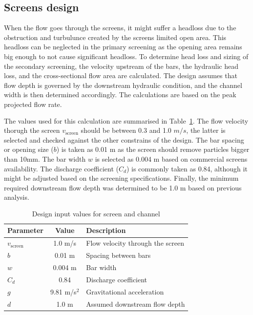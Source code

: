 \documentclass[12pt]{article}
\begin{document}
\subsection{Screens design}
\label{sec:screens_design}

When the flow goes through the screens, it might suffer a headloss due to
the obstruction and turbulunce created by the screens limited open area.
This headloss can be neglected in the primary screening as the opening area
remains big enough to not cause significant headloss. 
To determine head loss and sizing of the secondary screening, the velocity upstream of the bars, 
the hydraulic head loss, and the cross-sectional flow area are calculated. The design assumes 
that flow depth is governed by the downstream hydraulic condition, and the channel width is then determined accordingly. 
The calculations are based on the peak projected flow rate.


The values used for this calculation are summarised in Table~\ref{tab:screen_inputs}.
The flow velocity thorugh the screen $v_\text{screen}$ should 
be between 0.3 and 1.0 $m/s$, the latter is selected and checked 
against the other constrains of the design. The bar spacing or 
opening size ($b$) 
is taken as 0.01 m as the screen should remove 
particles bigger than 10mm. The bar width $w$ is selected as 
0.004 m based on commercial screens availability. The discharge 
coefficient ($C_d$) is commonly taken as 0.84, although it might be 
adjusted based on the screening specifications. Finally, the minimum 
required downstream flow depth was determined to be 1.0 m based 
on previous analysis.

\begin{table}[h]
\centering
\caption{Design input values for screen and channel}
\label{tab:screen_inputs}
\begin{tabular}{|l|c|l|}
\hline
\textbf{Parameter} & \textbf{Value} & \textbf{Description} \\
\hline
$v_{\text{screen}}$ & 1.0 m/s & Flow velocity through the screen \\
$b$ & 0.01 m & Spacing between bars \\
$w$ & 0.004 m & Bar width \\
$C_d$ & 0.84 & Discharge coefficient \\
$g$ & 9.81 m/s$^2$ & Gravitational acceleration \\
$d$ & 1.0 m & Assumed downstream flow depth \\
\hline
\end{tabular}
\end{table}
\end{document}
